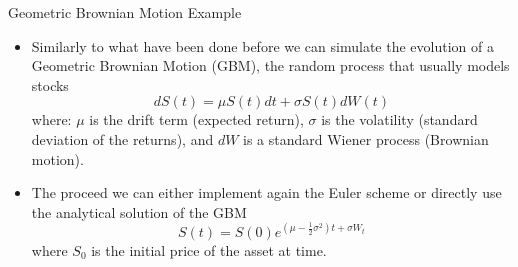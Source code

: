\documentclass{beamer}
\begin{document}
\begin{frame}{Geometric Brownian Motion Example}
\begin{itemize}
    \item Similarly to what have been done before we can simulate the evolution of a Geometric Brownian Motion (GBM), the random process that usually models stocks
    \begin{equation*}
        dS(t) = \mu S(t) dt + \sigma S(t) dW(t)
    \end{equation*}
    where: $\mu$ is the drift term (expected return), $\sigma$ is the volatility (standard deviation of the returns), and $dW$ is a standard Wiener process (Brownian motion).
    \item The proceed we can either implement again the Euler scheme or directly use the analytical solution of the GBM
    \begin{equation*}
        S(t) = S(0)e^{(\mu-\frac{1}{2}\sigma^2)t+\sigma W_t}
    \end{equation*}
    where $S_0$ is the initial price of the asset at time.
\end{itemize}
\end{frame}
\end{document}

